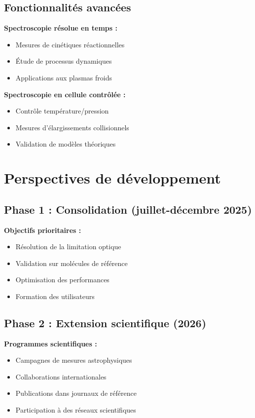 \subsection{Fonctionnalités avancées}

\textbf{Spectroscopie résolue en temps :}
\begin{itemize}
    \item Mesures de cinétiques réactionnelles
    \item Étude de processus dynamiques
    \item Applications aux plasmas froids
\end{itemize}

\textbf{Spectroscopie en cellule contrôlée :}
\begin{itemize}
    \item Contrôle température/pression
    \item Mesures d'élargissements collisionnels
    \item Validation de modèles théoriques
\end{itemize}

\section{Perspectives de développement}

\subsection{Phase 1 : Consolidation (juillet-décembre 2025)}

\textbf{Objectifs prioritaires :}
\begin{itemize}
    \item Résolution de la limitation optique
    \item Validation sur molécules de référence
    \item Optimisation des performances
    \item Formation des utilisateurs
\end{itemize}

\subsection{Phase 2 : Extension scientifique (2026)}

\textbf{Programmes scientifiques :}
\begin{itemize}
    \item Campagnes de mesures astrophysiques
    \item Collaborations internationales
    \item Publications dans journaux de référence
    \item Participation à des réseaux scientifiques
\end{itemize}

